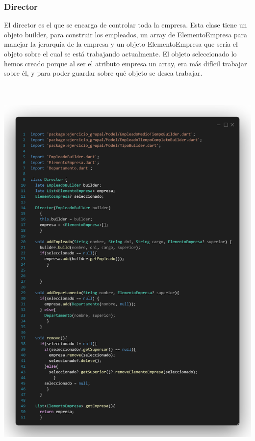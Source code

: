 \documentclass[
]{article}
\begin{document}
\subsubsection{Director}\label{director}

El director es el que se encarga de controlar toda la empresa. Esta
clase tiene un objeto builder, para construir los empleados, un array de
ElementoEmpresa para manejar la jerarquía de la empresa y un objeto
ElementoEmpresa que sería el objeto sobre el cual se está trabajando
actualmente. El objeto seleccionado lo hemos creado porque al ser el
atributo empresa un array, era más difícil trabajar sobre él, y para
poder guardar sobre qué objeto se desea trabajar.

\includegraphics[width=5.90522in,height=7.90278in]{imagenes/Director1.png}
\end{document}
